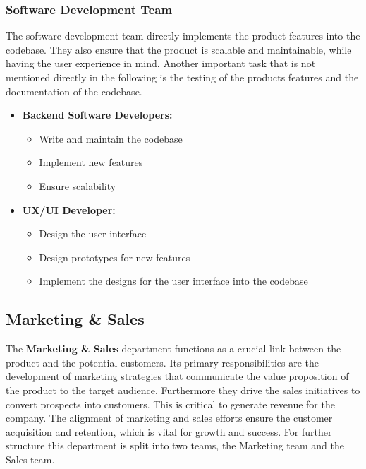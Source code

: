 \subsubsection*{Software Development Team}
The software development team directly implements the product features into the codebase.
They also ensure that the product is scalable and maintainable, while having the user experience in mind.
Another important task that is not mentioned directly in the following is the testing of the products features and the documentation of the codebase.
\begin{itemize}
    \item \textbf{Backend Software Developers:}
            \begin{itemize}
                \item Write and maintain the codebase
                \item Implement new features
                \item Ensure scalability
            \end{itemize}
    \item \textbf{UX/UI Developer:}
            \begin{itemize}
                \item Design the user interface
                \item Design prototypes for new features
                \item Implement the designs for the user interface into the codebase
            \end{itemize}
\end{itemize}

\subsection{Marketing \& Sales}
The \textbf{Marketing \& Sales} department functions as a crucial link between the product and the potential customers.
Its primary responsibilities are the development of marketing strategies that communicate the value proposition of the product to the target audience.
Furthermore they drive the sales initiatives to convert prospects into customers.
This is critical to generate revenue for the company.
The alignment of marketing and sales efforts ensure the customer acquisition and retention, which is vital for growth and success.
For further structure this department is split into two teams, the Marketing team and the Sales team.

